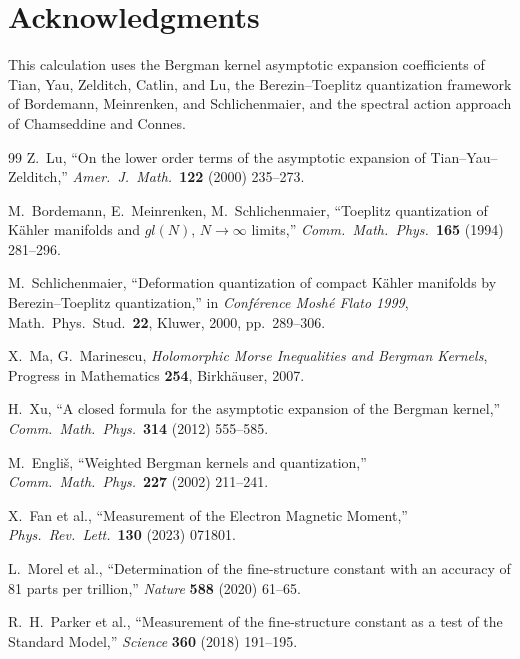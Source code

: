 \documentclass[12pt,a4paper]{article}
\theoremstyle{definition}
\theoremstyle{remark}
\begin{document}
\section*{Acknowledgments}

This calculation uses the Bergman kernel asymptotic expansion coefficients
of Tian, Yau, Zelditch, Catlin, and Lu, the Berezin--Toeplitz quantization
framework of Bordemann, Meinrenken, and Schlichenmaier, and the spectral
action approach of Chamseddine and Connes.

\begin{thebibliography}{99}
Z.~Lu, ``On the lower order terms of the asymptotic expansion of
Tian--Yau--Zelditch,'' \emph{Amer.\ J.\ Math.}\ \textbf{122} (2000)
235--273.

M.~Bordemann, E.~Meinrenken, M.~Schlichenmaier, ``Toeplitz quantization
of K\"ahler manifolds and $gl(N)$, $N \to \infty$ limits,''
\emph{Comm.\ Math.\ Phys.}\ \textbf{165} (1994) 281--296.

M.~Schlichenmaier, ``Deformation quantization of compact K\"ahler manifolds
by Berezin--Toeplitz quantization,'' in \emph{Conf\'erence Mosh\'e Flato
1999}, Math.\ Phys.\ Stud.\ \textbf{22}, Kluwer, 2000, pp.~289--306.

X.~Ma, G.~Marinescu, \emph{Holomorphic Morse Inequalities and Bergman
Kernels}, Progress in Mathematics \textbf{254}, Birkh\"auser, 2007.

H.~Xu, ``A closed formula for the asymptotic expansion of the Bergman
kernel,'' \emph{Comm.\ Math.\ Phys.}\ \textbf{314} (2012) 555--585.

M.~Engli\v{s}, ``Weighted Bergman kernels and quantization,''
\emph{Comm.\ Math.\ Phys.}\ \textbf{227} (2002) 211--241.

X.~Fan et al., ``Measurement of the Electron Magnetic Moment,''
\emph{Phys.\ Rev.\ Lett.}\ \textbf{130} (2023) 071801.

L.~Morel et al., ``Determination of the fine-structure constant with an
accuracy of 81 parts per trillion,'' \emph{Nature} \textbf{588} (2020)
61--65.

R.~H.~Parker et al., ``Measurement of the fine-structure constant as a
test of the Standard Model,'' \emph{Science} \textbf{360} (2018) 191--195.
\end{thebibliography}
\end{document}
